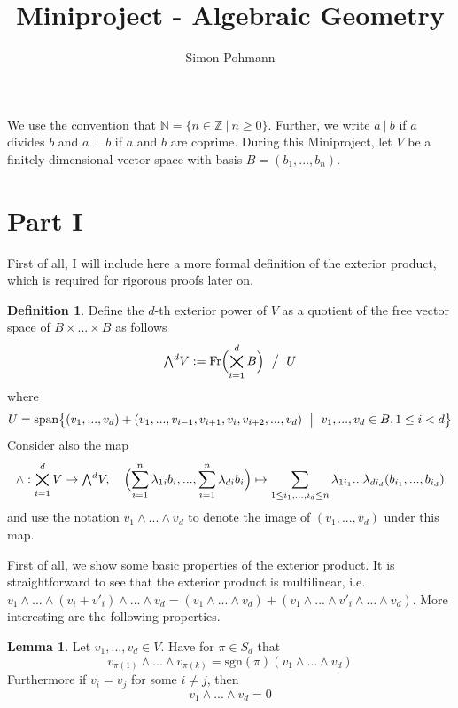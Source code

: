 \documentclass{scrartcl}
\title{Miniproject - Algebraic Geometry}
\author{Simon Pohmann}
\date{}
\newcommand{\N}{\mathbb{N}}
\newcommand{\Z}{\mathbb{Z}}
\newcommand{\sgn}{\mathrm{sgn}}
\newcommand{\extpow}{\mathchoice{{\textstyle\bigwedge}}
    {{\bigwedge}}
    {{\textstyle\wedge}}
    {{\scriptstyle\wedge}}}
\newcommand{\vspan}{\mathrm{span}}
\newcommand{\divides}{\ | \ }
\theoremstyle{definition}
\newtheorem{definition}[subsection]{Definition}
\newtheorem{lemma}[subsection]{Lemma}
\begin{document}
\maketitle

We use the convention that $\N = \{ n \in \Z \ | \ n \geq 0 \}$.
Further, we write $a \divides b$ if $a$ divides $b$ and $a \perp b$ if $a$ and $b$ are coprime.
During this Miniproject, let $V$ be a finitely dimensional vector space with basis $B = (b_1, ..., b_n)$.

\section{Part I}
First of all, I will include here a more formal definition of the exterior product, which is required for rigorous proofs later on.
\begin{definition}
    Define the $d$-th exterior power of $V$ as a quotient of the free vector space of $B \times ... \times B$ as follows
    \begin{align*}
        \extpow^d V := \mathrm{Fr}\Bigl(\bigtimes_{i = 1}^d B\Bigr) \ \bigm/ \ U
    \end{align*}
    where
    \begin{align*}
        U = \vspan \bigl\{ (v_1, ..., v_d) + (v_1, ..., v_{i - 1}, v_{i + 1}, v_i, v_{i + 2}, ..., v_d) \ \bigm| \ v_1, ..., v_d \in B, 1 \leq i < d \bigr\}
    \end{align*}
    Consider also the map
    \begin{equation*}
        \wedge: \bigtimes_{i = 1}^d V \to \extpow^d V, \quad \Bigl( \sum_{i = 1}^n \lambda_{1i} b_i, ..., \sum_{i = 1}^n \lambda_{di} b_i \Bigr) \mapsto \sum_{1 \leq i_1, ..., i_d \leq n} \lambda_{1i_1} ... \lambda_{di_d} (b_{i_1}, ..., b_{i_d})
    \end{equation*}
    and use the notation $v_1 \wedge ... \wedge v_d$ to denote the image of $(v_1, ..., v_d)$ under this map.
\end{definition}
First of all, we show some basic properties of the exterior product.
It is straightforward to see that the exterior product is multilinear, i.e. $v_1 \wedge ... \wedge (v_i + v'_i) \wedge ... \wedge v_d = (v_1 \wedge ... \wedge v_d) + (v_1 \wedge ... \wedge v'_i \wedge ... \wedge v_d)$.
More interesting are the following properties.
\begin{lemma}
    \label{prop:basic_properties_exterior_product}
    Let $v_1, ..., v_d \in V$. Have for $\pi \in S_d$ that
    \begin{equation*}
        v_{\pi(1)} \wedge ... \wedge v_{\pi(k)} = \sgn(\pi) (v_1 \wedge ... \wedge v_d)
    \end{equation*}
    Furthermore if $v_i = v_j$ for some $i \neq j$, then
    \begin{equation*}
        v_1 \wedge ... \wedge v_d = 0
    \end{equation*}
\end{lemma}
\end{document}
